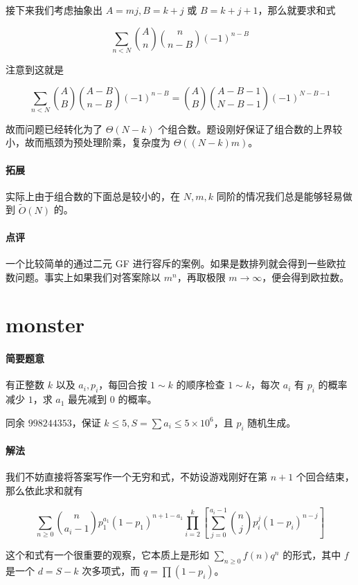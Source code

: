 \documentclass[12pt]{ctexart}
\theoremstyle{theorem}
\theoremstyle{theorem}
\begin{document}
接下来我们考虑抽象出 $A=mj,B=k+j$ 或 $B=k+j+1$，那么就要求和式

$$
\sum_{n<N} \binom An \binom{n}{n-B}(-1)^{n-B}
$$

注意到这就是

$$
\sum_{n<N} \binom AB \binom{A-B}{n-B}(-1)^{n-B}
=\binom AB \binom{A-B-1}{N-B-1}(-1)^{N-B-1}
$$

故而问题已经转化为了 $\Theta(N-k)$ 个组合数。题设刚好保证了组合数的上界较小，故而瓶颈为预处理阶乘，复杂度为 $\Theta((N-k)m)$。

\paragraph{拓展} 实际上由于组合数的下面总是较小的，在 $N,m,k$ 同阶的情况我们总是能够轻易做到 $\tilde O(N)$ 的。

\paragraph{点评} 一个比较简单的通过二元 GF 进行容斥的案例。如果是数排列就会得到一些欧拉数问题。事实上如果我们对答案除以 $m^n$，再取极限 $m \rightarrow \infty$，便会得到欧拉数。

\newpage

\section{monster}

\paragraph{简要题意} 有正整数 $k$ 以及 $a_i, p_i$，每回合按 $1\sim k$ 的顺序检查 $1\sim k$，每次 $a_i$ 有 $p_i$ 的概率减少 $1$，求 $a_1$ 最先减到 $0$ 的概率。

同余 $998244353$，保证 $k\le 5, S=\sum a_i \le 5\times 10^6$，且 $p_i$ 随机生成。

\paragraph{解法}

我们不妨直接将答案写作一个无穷和式，不妨设游戏刚好在第 $n+1$ 个回合结束，那么依此求和就有

$$
\sum_{n\ge 0} \binom n{a_i-1} p_1^{a_1} (1-p_1)^{n+1-a_1} \prod_{i=2}^k
\left[\sum_{j=0}^{a_i-1} \binom n j p_i^j(1-p_i)^{n-j}\right]
$$

这个和式有一个很重要的观察，它本质上是形如 $\sum_{n\ge 0} f(n) q^n$ 的形式，其中 $f$ 是一个 $d=S - k$ 次多项式，而 $q = \prod (1-p_i)$。
\end{document}
